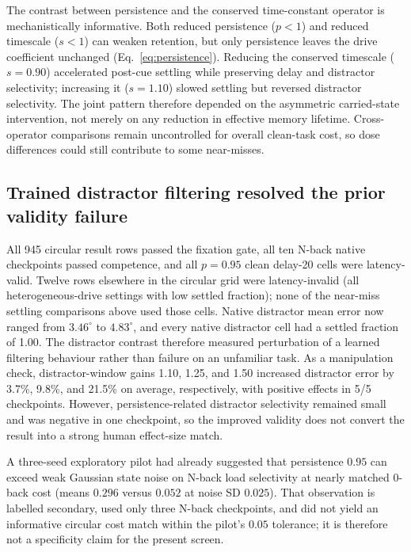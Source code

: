 The contrast between persistence and the conserved time-constant operator is
mechanistically informative. Both reduced persistence ($p<1$) and reduced
timescale ($s<1$) can weaken retention, but only persistence leaves the drive
coefficient unchanged (Eq.~\ref{eq:persistence}). Reducing the conserved
timescale ($s=0.90$) accelerated post-cue settling while preserving delay and
distractor selectivity; increasing it ($s=1.10$) slowed settling but reversed
distractor selectivity. The joint pattern therefore depended on the asymmetric
carried-state intervention, not merely on any reduction in effective memory
lifetime. Cross-operator comparisons remain uncontrolled for overall clean-task
cost, so dose differences could still contribute to some near-misses.

\subsection{Trained distractor filtering resolved the prior validity failure}

All 945 circular result rows passed the fixation gate, all ten N-back native
checkpoints passed competence, and all $p=0.95$ clean delay-20 cells were
latency-valid. Twelve rows elsewhere in the circular grid were latency-invalid
(all heterogeneous-drive settings with low settled fraction); none of the
near-miss settling comparisons above used those cells. Native distractor mean
error now ranged from $3.46^\circ$ to $4.83^\circ$, and every native distractor
cell had a settled fraction of 1.00. The distractor contrast therefore measured
perturbation of a learned filtering behaviour rather than failure on an
unfamiliar task. As a manipulation check, distractor-window gains 1.10, 1.25,
and 1.50 increased distractor error by 3.7\%, 9.8\%, and 21.5\% on average,
respectively, with positive effects in 5/5 checkpoints. However,
persistence-related distractor selectivity remained small and was negative in
one checkpoint, so the improved validity does not convert the result into a
strong human effect-size match.

A three-seed exploratory pilot had already suggested that persistence $0.95$
can exceed weak Gaussian state noise on N-back load selectivity at nearly
matched 0-back cost (means $0.296$ versus $0.052$ at noise SD $0.025$). That
observation is labelled secondary, used only three N-back checkpoints, and did
not yield an informative circular cost match within the pilot's $0.05$
tolerance; it is therefore not a specificity claim for the present screen.
